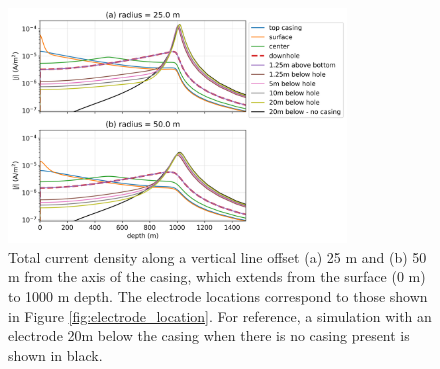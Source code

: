 \begin{figure}
    \begin{center}
    \includegraphics[width=0.8\textwidth]{figures/electrode_location_currents.png}
    \end{center}
\caption{
    Total current density along a vertical line offset (a) 25 m and (b) 50 m
    from the axis of the casing, which extends
    from the surface (0 m) to 1000 m depth.
    The electrode locations correspond to those shown in Figure \ref{fig:electrode_location}.
    For reference, a simulation with an electrode 20m below the casing when there is no casing present
    is shown in black.
}
\label{fig:electrode_location_currents}
\end{figure}
